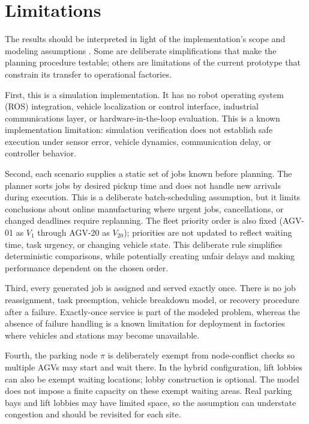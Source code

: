 \section{Limitations}
\label{sec:limitations}

The results should be interpreted in light of the implementation's scope and
modeling assumptions \cite{projectRepo}. Some are deliberate simplifications that make the
planning procedure testable; others are limitations of the current prototype
that constrain its transfer to operational factories.

First, this is a simulation implementation. It has no robot operating system
(ROS) integration, vehicle localization or control interface, industrial
communications layer, or hardware-in-the-loop evaluation. This is a known
implementation limitation: simulation verification does not establish safe
execution under sensor error, vehicle dynamics, communication delay, or
controller behavior.

Second, each scenario supplies a static set of jobs known before planning.
The planner sorts jobs by desired pickup time and does not handle new arrivals
during execution. This is a deliberate batch-scheduling assumption, but it
limits conclusions about online manufacturing where urgent jobs, cancellations,
or changed deadlines require replanning. The fleet priority order is also
fixed (AGV-01 as $V_1$ through AGV-20 as $V_{20}$); priorities are not updated
to reflect waiting time, task urgency, or changing vehicle state. This
deliberate rule simplifies deterministic comparisons, while potentially
creating unfair delays and making performance dependent on the chosen order.

Third, every generated job is assigned and served exactly once. There is no
job reassignment, task preemption, vehicle breakdown model, or recovery
procedure after a failure. Exactly-once service is part of the modeled
problem, whereas the absence of failure handling is a known limitation for
deployment in factories where vehicles and stations may become unavailable.

Fourth, the parking node $\pi$ is deliberately exempt from node-conflict
checks so multiple AGVs may start and wait there. In the hybrid configuration,
lift lobbies can also be exempt waiting locations; lobby construction is
optional. The model does not impose a finite capacity on these exempt waiting
areas. Real parking bays and lift lobbies may have limited space, so the
assumption can understate congestion and should be revisited for each site.

